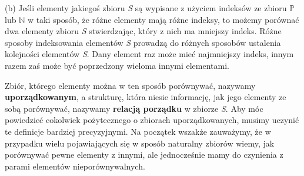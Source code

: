 \documentclass[14pt]{extarticle}
\begin{document}
\begin{changemargin}{160pt}{0pt} 
\qquad (b) Jeśli elementy jakiegoś zbioru \textit{S} są wypisane z użyciem
indeksów ze zbioru $\mathbb{P}$ lub $\mathbb{N}$ w taki sposób, że różne elementy mają różne indeksy, to możemy porównać dwa elementy zbioru \textit{S} stwierdzając, który z nich ma mniejszy indeks. Różne sposoby indeksowania elementów \textit{S} prowadzą do różnych sposobów ustalenia kolejności elementów \textit{S}. Dany element raz może mieć najmniejszy indeks, innym razem zaś może być poprzedzony wieloma innymi elementami.
\end{changemargin}

\begin{changemargin}{160pt}{0pt} 
\qquad Zbiór, którego elementy można w ten sposób porównywać, nazywamy \textbf{uporządkowanym}, a strukturę, która niesie informację, jak jego elementy ze sobą porównywać, nazywamy \textbf{relacją porządku} w zbiorze \textit{S}. Aby móc powiedzieć cokolwiek pożytecznego o zbiorach uporządkowanych, musimy uczynić te definicje bardziej precyzyjnymi. Na początek wszakże zauważymy, że w przypadku wielu pojawiających się w sposób naturalny zbiorów wiemy, jak porównywać pewne elementy z innymi, ale jednocześnie mamy do czynienia z parami elementów nieporównywalnych.
\end{changemargin}
\end{document}
